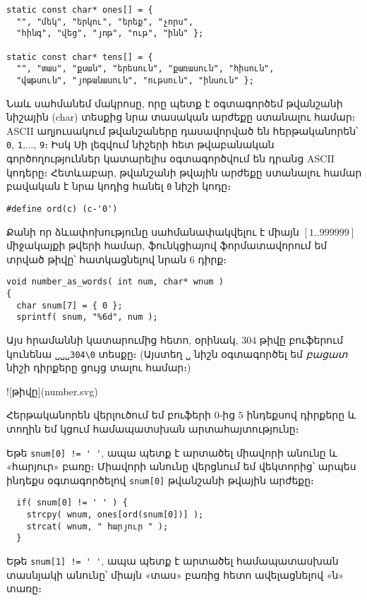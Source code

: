 \begin{Verbatim}
static const char* ones[] = {
  "", "մեկ", "երկու", "երեք", "չորս",
  "հինգ", "վեց", "յոթ", "ութ", "ինն" };

static const char* tens[] = {
  "", "տաս", "քսան", "երեսուն", "քառասուն", "հիսուն",
  "վաթսուն", "յոթանասուն", "ութսուն", "ինսուն" };
\end{Verbatim}

Նաև սահմանեմ  մակրոսը, որը պետք է օգտագործեմ թվանշանի
նիշային (char) տեսքից նրա տասական արժեքը ստանալու համար։ ASCII
աղյուսակում թվանշաները դասավորված են հերթականորեն՝ \texttt{0},
\texttt{1},..., \texttt{9}։ Իսկ Սի լեզվում նիշերի հետ թվաբանական
գործողություններ կատարելիս օգտագործվում են դրանց ASCII կոդերը։
Հետևաբար,  թվանշանի թվային արժեքը ստանալու համար բավական
է նրա կոդից հանել \texttt{0} նիշի կոդը։

\begin{Verbatim}
#define ord(c) (c-'0')
\end{Verbatim}

Քանի որ ձևափոխությունը սահմանափակվելու է միայն \([1..999999]\)
միջակայքի թվերի համար,  ֆունկցիայով ֆորմատավորում
եմ տրված թիվը՝ հատկացնելով նրան 6 դիրք։

\begin{Verbatim}
void number_as_words( int num, char* wnum )
{
  char snum[7] = { 0 };
  sprintf( snum, "%6d", num );
\end{Verbatim}

Այս հրամաննի կատարումից հետո, օրինակ, \(304\) թիվը 
բուֆերում կունենա \Verb|␣␣␣304\0| տեսքը։ (Այստեղ \Verb|␣| նիշն
օգտագործել եմ \emph{բացատ} նիշի դիրքերը ցույց տալու համար։)

![թիվը](number.svg)

Հերթականորեն վերլուծում եմ  բուֆերի \(0\)-ից \(5\)
ինդեքսով դիրքերը և  տողին եմ կցում համապատսխան
արտահայտությունը։

Եթե \Verb|snum[0] != ' '|, ապա պետք է արտածել միավորի անունը և
«հարյուր» բառը։ Միավորի անունը վերցնում եմ  վեկտորից՝
արպես ինդեքս օգտագործելով \Verb|snum[0]| թվանշանի թվային արժեքը։

\begin{Verbatim}
  if( snum[0] != ' ' ) {
    strcpy( wnum, ones[ord(snum[0])] );
    strcat( wnum, " հարյուր " );
  }
\end{Verbatim}

Եթե \Verb|snum[1] != ' '|, ապա պետք է արտածել համապատասխան տասնյակի
անունը՝ միայն «տաս» բառից հետո ավելացնելով «ն» տառը։

